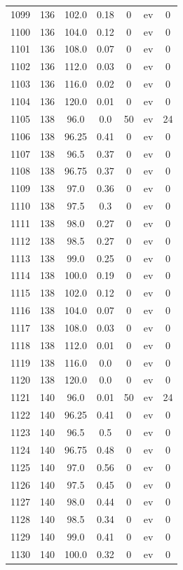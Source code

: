 \documentclass[12pt,a4paper]{article}
\begin{document}
\begin{tabular}{r|cccccc}
	1099 & 136 & 102.0 & 0.18 & 0 & ev & 0 \\
	1100 & 136 & 104.0 & 0.12 & 0 & ev & 0 \\
	1101 & 136 & 108.0 & 0.07 & 0 & ev & 0 \\
	1102 & 136 & 112.0 & 0.03 & 0 & ev & 0 \\
	1103 & 136 & 116.0 & 0.02 & 0 & ev & 0 \\
	1104 & 136 & 120.0 & 0.01 & 0 & ev & 0 \\
	1105 & 138 & 96.0 & 0.0 & 50 & ev & 24 \\
	1106 & 138 & 96.25 & 0.41 & 0 & ev & 0 \\
	1107 & 138 & 96.5 & 0.37 & 0 & ev & 0 \\
	1108 & 138 & 96.75 & 0.37 & 0 & ev & 0 \\
	1109 & 138 & 97.0 & 0.36 & 0 & ev & 0 \\
	1110 & 138 & 97.5 & 0.3 & 0 & ev & 0 \\
	1111 & 138 & 98.0 & 0.27 & 0 & ev & 0 \\
	1112 & 138 & 98.5 & 0.27 & 0 & ev & 0 \\
	1113 & 138 & 99.0 & 0.25 & 0 & ev & 0 \\
	1114 & 138 & 100.0 & 0.19 & 0 & ev & 0 \\
	1115 & 138 & 102.0 & 0.12 & 0 & ev & 0 \\
	1116 & 138 & 104.0 & 0.07 & 0 & ev & 0 \\
	1117 & 138 & 108.0 & 0.03 & 0 & ev & 0 \\
	1118 & 138 & 112.0 & 0.01 & 0 & ev & 0 \\
	1119 & 138 & 116.0 & 0.0 & 0 & ev & 0 \\
	1120 & 138 & 120.0 & 0.0 & 0 & ev & 0 \\
	1121 & 140 & 96.0 & 0.01 & 50 & ev & 24 \\
	1122 & 140 & 96.25 & 0.41 & 0 & ev & 0 \\
	1123 & 140 & 96.5 & 0.5 & 0 & ev & 0 \\
	1124 & 140 & 96.75 & 0.48 & 0 & ev & 0 \\
	1125 & 140 & 97.0 & 0.56 & 0 & ev & 0 \\
	1126 & 140 & 97.5 & 0.45 & 0 & ev & 0 \\
	1127 & 140 & 98.0 & 0.44 & 0 & ev & 0 \\
	1128 & 140 & 98.5 & 0.34 & 0 & ev & 0 \\
	1129 & 140 & 99.0 & 0.41 & 0 & ev & 0 \\
	1130 & 140 & 100.0 & 0.32 & 0 & ev & 0 \\

\end{tabular}
\end{document}
